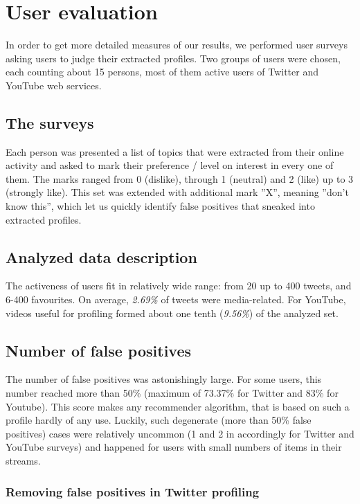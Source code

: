 \section{User evaluation}
In order to get more detailed measures of our results, we performed user surveys
asking users to judge their extracted profiles. Two groups of users were chosen,
each counting about 15 persons, most of them active users of Twitter and YouTube
web services.

\subsection{The surveys}

Each person was presented a list of topics that were extracted from their online
activity and asked to mark their preference / level on interest in every one of
them. The marks ranged from 0 (dislike), through 1 (neutral) and 2 (like) up to
3 (strongly like). This set was extended with additional mark ''X'', meaning
''don't know this'', which let us quickly identify false positives that sneaked
into extracted profiles.

\subsection{Analyzed data description}
The activeness of users fit in relatively wide range: from 20 up to 400 tweets,
and 6-400 favourites. On average, \textit{2.69\%} of tweets were media-related.
For YouTube, videos useful for profiling formed about one tenth (\textit{9.56\%})
of the analyzed set.

\subsection{Number of false positives}
The number of false positives was astonishingly large. For some users, this
number reached more than 50\% (maximum of 73.37\% for Twitter and 83\% for
Youtube). This score makes any
recommender algorithm, that is based on such a profile hardly of any use.
Luckily, such degenerate (more than 50\% false positives) cases were relatively
uncommon (1 and 2 in accordingly for Twitter and YouTube surveys) and happened
for users with small numbers of items in their streams.

\subsubsection{Removing false positives in Twitter profiling}

